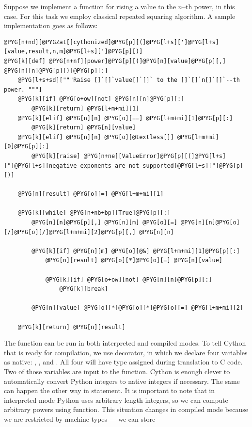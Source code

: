 Suppose we implement a function for rising a value to the $n$--th power,  in this case.
For this task we employ classical repeated squaring algorithm. A sample implementation goes as follows:

\begin{Verbatim}[commandchars=@\[\]]
@PYG[n+nd][@PYGZat[]cythonized]@PYG[p][(]@PYG[l+s][']@PYG[l+s][value,result,n,m]@PYG[l+s][']@PYG[p][)]
@PYG[k][def] @PYG[n+nf][power]@PYG[p][(]@PYG[n][value]@PYG[p][,] @PYG[n][n]@PYG[p][)]@PYG[p][:]
    @PYG[l+s+sd]["""Raise []`[]`value[]`[]` to the []`[]`n[]`[]`--th power. """]
    @PYG[k][if] @PYG[o+ow][not] @PYG[n][n]@PYG[p][:]
        @PYG[k][return] @PYG[l+m+mi][1]
    @PYG[k][elif] @PYG[n][n] @PYG[o][==] @PYG[l+m+mi][1]@PYG[p][:]
        @PYG[k][return] @PYG[n][value]
    @PYG[k][elif] @PYG[n][n] @PYG[o][@textless[]] @PYG[l+m+mi][0]@PYG[p][:]
        @PYG[k][raise] @PYG[n+ne][ValueError]@PYG[p][(]@PYG[l+s]["]@PYG[l+s][negative exponents are not supported]@PYG[l+s]["]@PYG[p][)]

    @PYG[n][result] @PYG[o][=] @PYG[l+m+mi][1]

    @PYG[k][while] @PYG[n+nb+bp][True]@PYG[p][:]
        @PYG[n][n]@PYG[p][,] @PYG[n][m] @PYG[o][=] @PYG[n][n]@PYG[o][/]@PYG[o][/]@PYG[l+m+mi][2]@PYG[p][,] @PYG[n][n]

        @PYG[k][if] @PYG[n][m] @PYG[o][@&] @PYG[l+m+mi][1]@PYG[p][:]
            @PYG[n][result] @PYG[o][*]@PYG[o][=] @PYG[n][value]

            @PYG[k][if] @PYG[o+ow][not] @PYG[n][n]@PYG[p][:]
                @PYG[k][break]

        @PYG[n][value] @PYG[o][*]@PYG[o][*]@PYG[o][=] @PYG[l+m+mi][2]

    @PYG[k][return] @PYG[n][result]
\end{Verbatim}
\noindent
The function can be run in both interpreted and compiled modes. To tell Cython that 
is ready for compilation, we use  decorator, in which we declare four variables as
native: , ,  and . All four will have  type assigned during
translation to C code. Two of those variables are input to the function. Cython is enough clever
to automatically convert Python integers to native integers if necessary. The same can happen the
other way in  statement. It is important to note that in interpreted mode Python uses
arbitrary length integers, so we can compute arbitrary powers using  function. This
situation changes in compiled mode because we are restricted by machine types --- we can store
